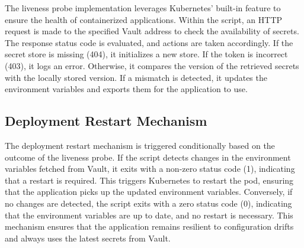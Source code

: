 The liveness probe implementation leverages Kubernetes' built-in feature to ensure the health of containerized applications. Within the script, an HTTP request is made to the specified Vault address to check the availability of secrets. The response status code is evaluated, and actions are taken accordingly. If the secret store is missing (404), it initializes a new store. If the token is incorrect (403), it logs an error. Otherwise, it compares the version of the retrieved secrets with the locally stored version. If a mismatch is detected, it updates the environment variables and exports them for the application to use.

\subsection{Deployment Restart Mechanism}

The deployment restart mechanism is triggered conditionally based on the outcome of the liveness probe. If the script detects changes in the environment variables fetched from Vault, it exits with a non-zero status code (1), indicating that a restart is required. This triggers Kubernetes to restart the pod, ensuring that the application picks up the updated environment variables. Conversely, if no changes are detected, the script exits with a zero status code (0), indicating that the environment variables are up to date, and no restart is necessary. This mechanism ensures that the application remains resilient to configuration drifts and always uses the latest secrets from Vault.
